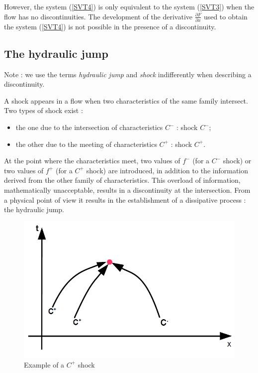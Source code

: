 However, the system (\ref{SVT4}) is only equivalent to the system (\ref{SVT3}) when the flow has no discontinuities. The development of the derivative $\frac{\partial F}{\partial x}$ used to obtain the system (\ref{SVT4}) is not possible in the presence of a discontinuity.

\subsection{The hydraulic jump}

\begin{CommentBlock}{Note :}
we use the terms \textit{hydraulic jump} and \textit{shock} indifferently when describing a discontinuity.
\end{CommentBlock}

A shock appears in a flow when two characteristics of the same family intersect. Two types of shock exist :
\begin{itemize}
 \item the one due to the intersection of characteristics $C^-$ : shock $C^-$;
 \item the other due to the meeting of characteristics $C^+$ : shock $C^+$.
\end{itemize}

At the point where the characteristics meet, two values of $f^-$ (for a $C^-$ shock) or two values of $f^+$ (for a $C^+$ shock) are introduced, in addition to the information derived from the other family of characteristics. This overload of information, mathematically unacceptable, results in a discontinuity at the intersection. From a physical point of view it results in the establishment of a dissipative process : the hydraulic jump.

\begin{figure}[H]
 \begin{center}
  \includegraphics[width=\textwidth]{Figures/3Carac.png}
  \caption{Example of a $C^+$ shock}
 \end{center}
\end{figure}

